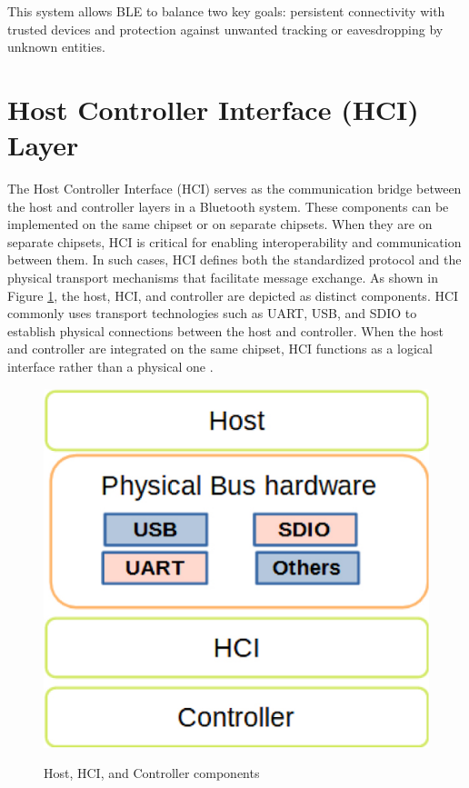 This system allows BLE to balance two key goals: persistent connectivity with trusted devices and protection against unwanted tracking or eavesdropping by unknown entities.

\section{Host Controller Interface (HCI) Layer}

The Host Controller Interface (HCI) serves as the communication bridge between the host and controller layers in a Bluetooth system. These components can be implemented on the same chipset or on separate chipsets. When they are on separate chipsets, HCI is critical for enabling interoperability and communication between them. In such cases, HCI defines both the standardized protocol and the physical transport mechanisms that facilitate message exchange. As shown in Figure \ref{fig:hosthcicontroller}, the host, HCI, and controller are depicted as distinct components. HCI commonly uses transport technologies such as UART, USB, and SDIO to establish physical connections between the host and controller. When the host and controller are integrated on the same chipset, HCI functions as a logical interface rather than a physical one \cite{introtoble}.

\begin{figure}[h]
    \caption{Host, HCI, and Controller components}
    \includegraphics[scale=.6]{hosthcicontroller.png}
    \label{fig:hosthcicontroller}
    \end{figure}

